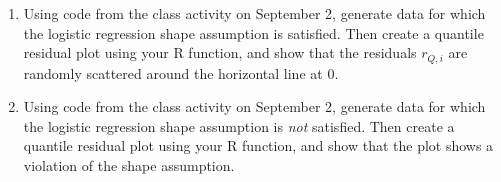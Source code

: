 \documentclass[11pt]{article}
\begin{document}
\begin{enumerate}
\begin{enumerate}
\item Using code from the class activity on September 2, generate data for which the logistic regression shape assumption is satisfied. Then create a quantile residual plot using your R function, and show that the residuals $r_{Q,i}$ are randomly scattered around the horizontal line at 0.

\item Using code from the class activity on September 2, generate data for which the logistic regression shape assumption is \textit{not} satisfied. Then create a quantile residual plot using your R function, and show that the plot shows a violation of the shape assumption.
\end{enumerate}
\end{enumerate}
\end{document}
